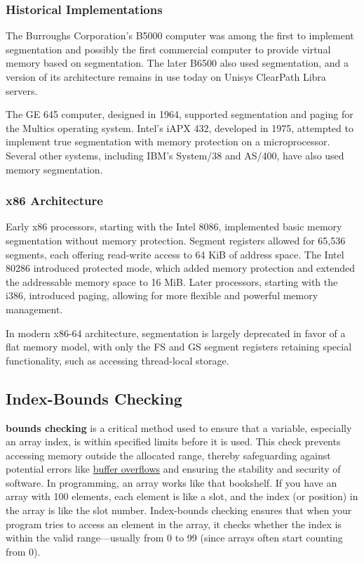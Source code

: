 \documentclass[12pt, oneside]{book}
\begin{document}
\subsubsection{Historical Implementations}
The Burroughs Corporation's B5000 computer was among the first to implement segmentation and possibly the first commercial computer to provide virtual memory based on segmentation. The later B6500 also used segmentation, and a version of its architecture remains in use today on Unisys ClearPath Libra servers.

The GE 645 computer, designed in 1964, supported segmentation and paging for the Multics operating system. Intel's iAPX 432, developed in 1975, attempted to implement true segmentation with memory protection on a microprocessor. Several other systems, including IBM's System/38 and AS/400, have also used memory segmentation.

\subsubsection{x86 Architecture}
Early x86 processors, starting with the Intel 8086, implemented basic memory segmentation without memory protection. Segment registers allowed for 65,536 segments, each offering read-write access to 64 KiB of address space. The Intel 80286 introduced protected mode, which added memory protection and extended the addressable memory space to 16 MiB. Later processors, starting with the i386, introduced paging, allowing for more flexible and powerful memory management.

In modern x86-64 architecture, segmentation is largely deprecated in favor of a flat memory model, with only the FS and GS segment registers retaining special functionality, such as accessing thread-local storage.

\subsection{Index-Bounds Checking}
\textbf{bounds checking} is a critical method used to ensure that a variable, especially an array index, is within specified limits before it is used. This check prevents accessing memory outside the allocated range, thereby safeguarding against potential errors like \href{https://en.wikipedia.org/wiki/Buffer_overflow}{buffer overflows} and ensuring the stability and security of software. In programming, an array works like that bookshelf. If you have an array with 100 elements, each element is like a slot, and the index (or position) in the array is like the slot number. Index-bounds checking ensures that when your program tries to access an element in the array, it checks whether the index is within the valid range—usually from 0 to 99 (since arrays often start counting from 0). 
\end{document}
